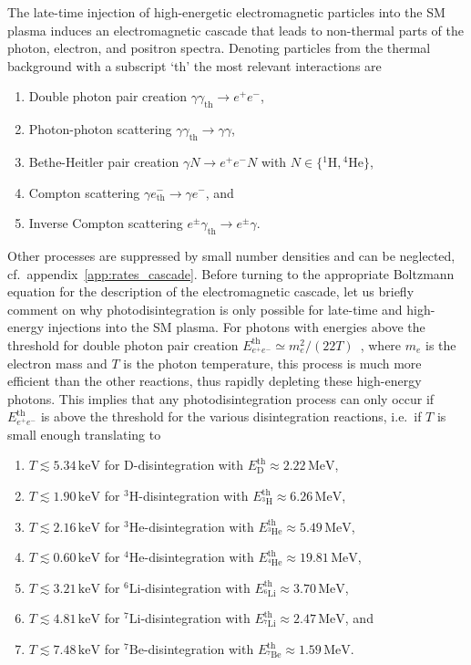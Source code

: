 \documentclass[11pt,a4paper]{article}
\begin{document}
The late-time injection of high-energetic electromagnetic particles into the SM plasma induces an electromagnetic cascade that leads to non-thermal parts of the photon, electron, and positron spectra. Denoting particles from the thermal background with a subscript `th' the most relevant interactions are
\begin{enumerate}
\item Double photon pair creation $\gamma \gamma_\mathrm{th} \rightarrow e^+ e^-$,
\item Photon-photon scattering $\gamma \gamma_\mathrm{th} \rightarrow \gamma \gamma$,
\item Bethe-Heitler pair creation $\gamma N \rightarrow e^+ e^- N$ with $N \in \{{}^1 \mathrm{H}, {}^4 \mathrm{He} \}$,
\item Compton scattering $\gamma e^-_\mathrm{th} \rightarrow \gamma e^-$, and
\item Inverse Compton scattering $e^\pm \gamma_\mathrm{th} \rightarrow e^\pm \gamma$.
\end{enumerate}
Other processes are suppressed by small number densities and can be neglected, cf.\ appendix~\ref{app:rates_cascade}. Before turning to the appropriate Boltzmann equation for the description of the electromagnetic cascade, let us briefly comment on why photodisintegration is only possible for late-time and high-energy injections into the SM plasma. For photons with energies above the threshold for double photon pair creation $E_{e^+ e^-}^\mathrm{th} \simeq m_e^2/(22 T)$~\cite{Kawasaki:1994sc}, where $m_e$ is the electron mass and $T$ is the photon temperature, this process is much more efficient than the other reactions, thus rapidly depleting these high-energy photons. This implies that any photodisintegration process can only occur if $E_{e^+ e^-}^\mathrm{th}$ is above the threshold for the various disintegration reactions, i.e.\ if $T$ is small enough translating to
\begin{enumerate}
\item $T \lesssim 5.34 \, \mathrm{keV}$ for $\mathrm{D}$-disintegration with $E_\mathrm{D}^\mathrm{th} \approx 2.22 \, \mathrm{MeV}$,
\item $T \lesssim 1.90 \, \mathrm{keV}$ for ${}^3\mathrm{H}$-disintegration with $E_{{}^3\mathrm{H}}^\mathrm{th} \approx 6.26 \, \mathrm{MeV}$,
\item $T \lesssim 2.16 \, \mathrm{keV}$ for ${}^3\mathrm{He}$-disintegration with $E_{{}^3\mathrm{He}}^\mathrm{th} \approx 5.49 \, \mathrm{MeV}$,
\item $T \lesssim 0.60 \, \mathrm{keV}$ for ${}^4\mathrm{He}$-disintegration with $E_{{}^4\mathrm{He}}^\mathrm{th} \approx 19.81 \, \mathrm{MeV}$,
\item $T \lesssim 3.21 \, \mathrm{keV}$ for ${}^6\mathrm{Li}$-disintegration with $E_{{}^6\mathrm{Li}}^\mathrm{th} \approx 3.70 \, \mathrm{MeV}$,
\item $T \lesssim 4.81 \, \mathrm{keV}$ for ${}^7\mathrm{Li}$-disintegration with $E_{{}^7\mathrm{Li}}^\mathrm{th} \approx 2.47 \, \mathrm{MeV}$, and
\item $T \lesssim 7.48 \, \mathrm{keV}$ for ${}^7\mathrm{Be}$-disintegration with $E_{{}^7\mathrm{Be}}^\mathrm{th} \approx 1.59 \, \mathrm{MeV}$.
\end{enumerate}
\end{document}
